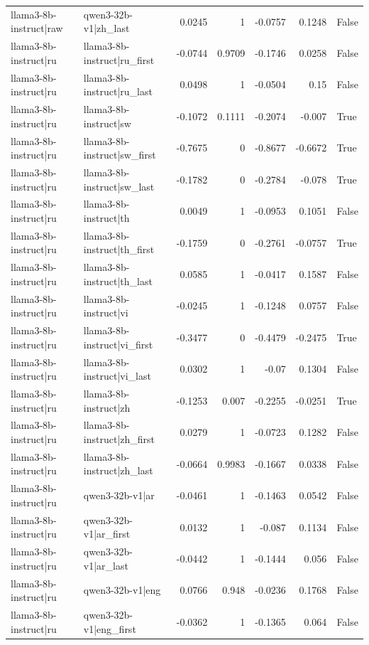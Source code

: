 \begin{table}
\begin{tabular}{l l r r r r l}
llama3-8b-instruct|raw & qwen3-32b-v1|zh_last & 0.0245 & 1 & -0.0757 & 0.1248 & False \\
llama3-8b-instruct|ru & llama3-8b-instruct|ru_first & -0.0744 & 0.9709 & -0.1746 & 0.0258 & False \\
llama3-8b-instruct|ru & llama3-8b-instruct|ru_last & 0.0498 & 1 & -0.0504 & 0.15 & False \\
llama3-8b-instruct|ru & llama3-8b-instruct|sw & -0.1072 & 0.1111 & -0.2074 & -0.007 & True \\
llama3-8b-instruct|ru & llama3-8b-instruct|sw_first & -0.7675 & 0 & -0.8677 & -0.6672 & True \\
llama3-8b-instruct|ru & llama3-8b-instruct|sw_last & -0.1782 & 0 & -0.2784 & -0.078 & True \\
llama3-8b-instruct|ru & llama3-8b-instruct|th & 0.0049 & 1 & -0.0953 & 0.1051 & False \\
llama3-8b-instruct|ru & llama3-8b-instruct|th_first & -0.1759 & 0 & -0.2761 & -0.0757 & True \\
llama3-8b-instruct|ru & llama3-8b-instruct|th_last & 0.0585 & 1 & -0.0417 & 0.1587 & False \\
llama3-8b-instruct|ru & llama3-8b-instruct|vi & -0.0245 & 1 & -0.1248 & 0.0757 & False \\
llama3-8b-instruct|ru & llama3-8b-instruct|vi_first & -0.3477 & 0 & -0.4479 & -0.2475 & True \\
llama3-8b-instruct|ru & llama3-8b-instruct|vi_last & 0.0302 & 1 & -0.07 & 0.1304 & False \\
llama3-8b-instruct|ru & llama3-8b-instruct|zh & -0.1253 & 0.007 & -0.2255 & -0.0251 & True \\
llama3-8b-instruct|ru & llama3-8b-instruct|zh_first & 0.0279 & 1 & -0.0723 & 0.1282 & False \\
llama3-8b-instruct|ru & llama3-8b-instruct|zh_last & -0.0664 & 0.9983 & -0.1667 & 0.0338 & False \\
llama3-8b-instruct|ru & qwen3-32b-v1|ar & -0.0461 & 1 & -0.1463 & 0.0542 & False \\
llama3-8b-instruct|ru & qwen3-32b-v1|ar_first & 0.0132 & 1 & -0.087 & 0.1134 & False \\
llama3-8b-instruct|ru & qwen3-32b-v1|ar_last & -0.0442 & 1 & -0.1444 & 0.056 & False \\
llama3-8b-instruct|ru & qwen3-32b-v1|eng & 0.0766 & 0.948 & -0.0236 & 0.1768 & False \\
llama3-8b-instruct|ru & qwen3-32b-v1|eng_first & -0.0362 & 1 & -0.1365 & 0.064 & False \\

\end{tabular}
\end{table}
